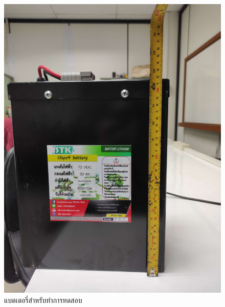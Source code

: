 \begin{center}
\begin{figure}[H]
		\includegraphics[width=0.5\linewidth]{Chapters/img/Battery_72V_30AH}
		\centering
		\captionsetup{justification=centering,margin=2cm}
		\caption{แบตเตอรี่สำหรับทำการทดสอบ}
	\end{figure}
\end{center}
